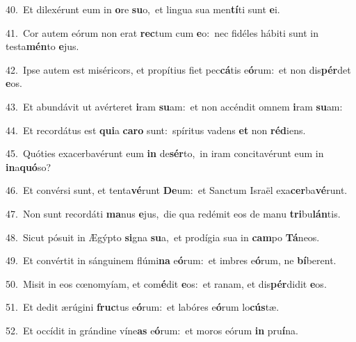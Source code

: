 {\numbfont\textcolor{\numbcolor}{40.}}~Et dilexérunt eum in \textbf{o}\-re \textbf{su}\-o,~\star et lingua sua men\-\textbf{tí}\-ti sunt \textbf{e}\-i.\par
{\numbfont\textcolor{\numbcolor}{41.}}~Cor autem eórum non erat \textbf{rec}\-tum cum \textbf{e}\-o:~\star nec fidéles hábiti sunt in testa\-\textbf{mén}\-to \textbf{e}\-jus.\par
{\numbfont\textcolor{\numbcolor}{42.}}~Ipse autem est miséricors, et propítius fiet pec\-\textbf{cá}\-tis e\-\textbf{ó}\-rum:~\star et non dis\-\textbf{pér}\-det \textbf{e}\-os.\par
{\numbfont\textcolor{\numbcolor}{43.}}~Et abundávit ut avérteret \textbf{i}\-ram \textbf{su}\-am:~\star et non accéndit omnem \textbf{i}\-ram \textbf{su}\-am:\par
{\numbfont\textcolor{\numbcolor}{44.}}~Et recordátus est \textbf{qui}\-a \textbf{ca}\-\textbf{ro} sunt:~\star spíritus vadens \textbf{et} non \textbf{réd}\-iens.\par
{\numbfont\textcolor{\numbcolor}{45.}}~Quóties exacerbavérunt eum \textbf{in} de\-\textbf{sér}\-to,~\star in iram concitavérunt eum in \textbf{in}\-a\-\textbf{quó}\-so?\par
{\numbfont\textcolor{\numbcolor}{46.}}~Et convérsi sunt, et tenta\-\textbf{vé}\-runt \textbf{De}\-um:~\star et Sanctum Israël exa\-\textbf{cer}\-ba\-\textbf{vé}\-runt.\par
{\numbfont\textcolor{\numbcolor}{47.}}~Non sunt recordáti \textbf{ma}\-nus \textbf{e}\-jus,~\star die qua redémit eos de manu \textbf{tri}\-bu\-\textbf{lán}\-tis.\par
{\numbfont\textcolor{\numbcolor}{48.}}~Sicut pósuit in Ægýpto \textbf{si}\-gna \textbf{su}\-a,~\star et prodígia sua in \textbf{cam}\-po \textbf{Tá}\-neos.\par
{\numbfont\textcolor{\numbcolor}{49.}}~Et convértit in sánguinem flúmi\textbf{na} e\-\textbf{ó}\-rum:~\star et imbres e\-\textbf{ó}\-rum, ne \textbf{bí}\-berent.\par
{\numbfont\textcolor{\numbcolor}{50.}}~Misit in eos cœnomyíam, et com\-\textbf{é}\-dit \textbf{e}\-os:~\star et ranam, et dis\-\textbf{pér}\-didit \textbf{e}\-os.\par
{\numbfont\textcolor{\numbcolor}{51.}}~Et dedit ærúgini \textbf{fruc}\-tus e\-\textbf{ó}\-rum:~\star et labóres e\-\textbf{ó}\-rum lo\-\textbf{cús}\-tæ.\par
{\numbfont\textcolor{\numbcolor}{52.}}~Et occídit in grándine víne\textbf{as} e\-\textbf{ó}\-rum:~\star et moros eórum \textbf{in} pru\-\textbf{í}\-na.\par
